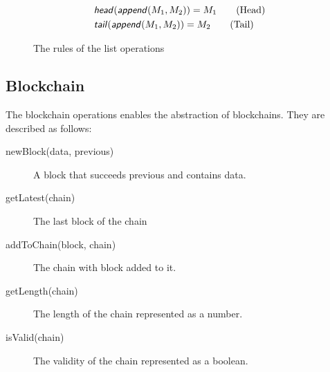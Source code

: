 \begin{figure}[h]
	\begin{align*}
		&\text{\sffamily \textit{head}\normalfont}(\text{\sffamily \textit{append}\normalfont}(M_1, M_2)) = M_1 \tag{Head} \\
		&\text{\sffamily \textit{tail}\normalfont}(\text{\sffamily \textit{append}\normalfont}(M_1, M_2)) = M_2 \tag{Tail}
	\end{align*}
	\caption{The rules of the list operations}
	\label{listoprules}
\end{figure}
\FloatBarrier

\subsection{Blockchain}

The blockchain operations enables the abstraction of blockchains.
They are described as follows:

\begin{description}
	\item[newBlock(data, previous)]
	A block that succeeds previous and contains data.
	\item[getLatest(chain)]
	The last block of the chain
	\item[addToChain(block, chain)]
	The chain with block added to it.
	\item[getLength(chain)]
	The length of the chain represented as a number.
	\item[isValid(chain)]
	The validity of the chain represented as a boolean.
\end{description}
